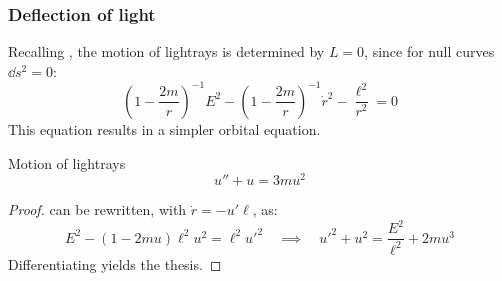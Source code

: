 \subsubsection{Deflection of light}

Recalling , the motion of lightrays is determined by $ L = 0 $, since for null curves $ \dd s^2 = 0 $:
\begin{equation}
  \left( 1 - \frac{2m}{r} \right)^{-1} E^2 - \left( 1 - \frac{2m}{r} \right)^{-1} \dot{r}^2 - \frac{\ell^2}{r^2} = 0
  \label{eq:schwarz-lightray}
\end{equation}
This equation results in a simpler orbital equation.

\begin{proposition}[before upper = {\tcbtitle}]{Motion of lightrays}{}
  \begin{equation}
    u'' + u = 3mu^2
  \end{equation}
\end{proposition}

\begin{proofbox}
  \begin{proof}
     can be rewritten, with $ \dot{r} = - u' \ell $, as:
    \begin{equation*}
      E^2 - \left( 1 - 2mu \right) \ell^2 u^2 = \ell^2 u'^2
      \quad \implies \quad
      u'^2 + u^2 = \frac{E^2}{\ell^2} + 2mu^3
    \end{equation*}
    Differentiating yields the thesis.
  \end{proof}
\end{proofbox}

